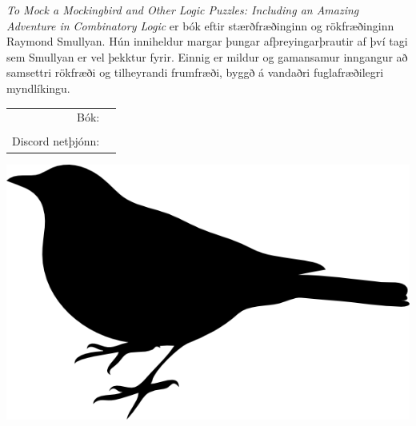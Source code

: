 \documentclass[letterpaper]{article}
\begin{document}


\emph{To Mock a Mockingbird and Other Logic Puzzles: Including an Amazing Adventure in Combinatory Logic} er bók eftir stærðfræðinginn og rökfræðinginn Raymond Smullyan. Hún inniheldur margar þungar afþreyingarþrautir af því tagi sem Smullyan er vel þekktur fyrir. Einnig er mildur og gamansamur inngangur að samsettri rökfræði og tilheyrandi frumfræði, byggð á vandaðri fuglafræðilegri myndlíkingu.

\vspace{0.75in}
\begin{tabular}{rl}
    \csctimefont Bók: &  \\
    & \\
    \csctimefont Discord netþjónn: &
\end{tabular}

\vspace{0.5in}
\begin{center}
\includegraphics[scale = 0.75]{mockingbird_logo.png}
\end{center}

\vspace{-15pt}
\vspace{-15pt}
\centering {}
\end{document}
